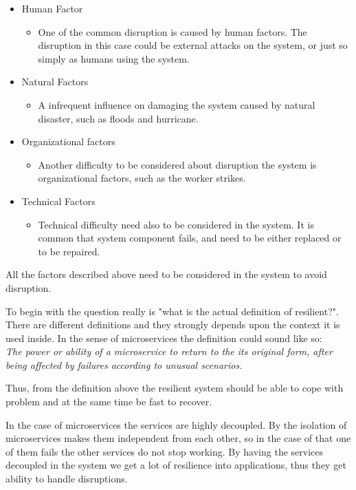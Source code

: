 \begin{itemize}
	\item Human Factor
	\begin{itemize}
		\item One of the common disruption is caused by human factors. The disruption in this case could be external attacks on the system, or just so simply as humans using the system.  
	\end{itemize}
	\item Natural Factors
	\begin{itemize}
		\item A infrequent influence on damaging the system caused by natural disaster, such as floods and hurricane. 
	\end{itemize}
	\item Organizational factors
	\begin{itemize}
		\item Another difficulty to be considered about disruption the system is organizational factors, such as the worker strikes.   
	\end{itemize}
	\item Technical Factors
	\begin{itemize}
		\item Technical difficulty need also to be considered in the system. It is common that system component fails, and need to be either replaced or to be repaired.   
	\end{itemize}	
\end{itemize}

All the factors described above need to be considered in the system to avoid disruption. 

To begin with the question really is "what is the actual definition of resilient?". There are different definitions and they strongly depends upon the context it is used inside. In the sense of microservices the definition could sound like so:\\
\textit{The power or ability of a microservice to return to the its original form, after being affected by failures according to unusual scenarios.}

Thus, from the definition above the resilient system should be able to cope with problem and at the same time be fast to recover. 

In the case of microservices the services are highly decoupled. By the isolation of microservices makes them independent from each other, so in the case of that one of them fails the other services do not stop working. By having the services decoupled in the system we get a lot of resilience into applications, thus they get ability to handle disruptions. 

